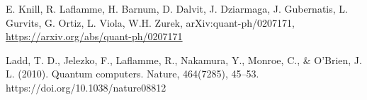 \documentclass{../lab}
\begin{document}
\begin{thebibliography}{}
\label{sec:References}
     E. Knill, R. Laflamme, H. Barnum, D. Dalvit, J. Dziarmaga, J. Gubernatis, L. Gurvits, G. Ortiz, L. Viola, W.H. Zurek,
    	arXiv:quant-ph/0207171, \url{https://arxiv.org/abs/quant-ph/0207171}

 Ladd, T. D., Jelezko, F., Laflamme, R., Nakamura, Y., Monroe, C., \& O’Brien, J. L. (2010). Quantum computers. Nature, 464(7285), 45–53. https://doi.org/10.1038/nature08812    
    
\end{thebibliography}
\end{document}
